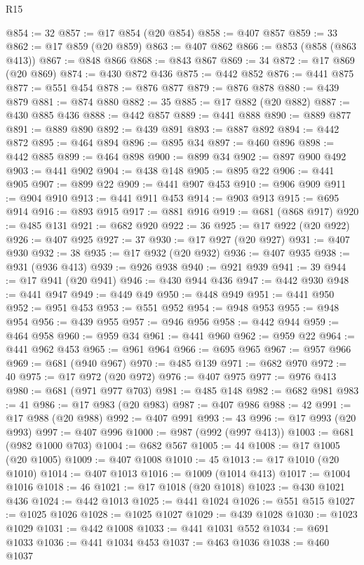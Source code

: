\begin{lexlean}{R15}
\begin{coremodule}
@854 := 32
@857 := @17 @854 (@20 @854)
@858 := @407 @857
@859 := 33
@862 := @17 @859 (@20 @859)
@863 := @407 @862
@866 := @853 (@858 (@863 @413))
@867 := @848 @866
@868 := @843 @867
@869 := 34
@872 := @17 @869 (@20 @869)
@874 := @430 @872 @436
@875 := @442 @852
@876 := @441 @875
@877 := @551 @454
@878 := @876 @877
@879 := @876 @878
@880 := @439 @879
@881 := @874 @880
@882 := 35
@885 := @17 @882 (@20 @882)
@887 := @430 @885 @436
@888 := @442 @857
@889 := @441 @888
@890 := @889 @877
@891 := @889 @890
@892 := @439 @891
@893 := @887 @892
@894 := @442 @872
@895 := @464 @894
@896 := @895 @34
@897 := @460 @896
@898 := @442 @885
@899 := @464 @898
@900 := @899 @34
@902 := @897 @900 @492
@903 := @441 @902
@904 := @438 @148
@905 := @895 @22
@906 := @441 @905
@907 := @899 @22
@909 := @441 @907 @453
@910 := @906 @909
@911 := @904 @910
@913 := @441 @911 @453
@914 := @903 @913
@915 := @695 @914
@916 := @893 @915
@917 := @881 @916
@919 := @681 (@868 @917)
@920 := @485 @131
@921 := @682 @920
@922 := 36
@925 := @17 @922 (@20 @922)
@926 := @407 @925
@927 := 37
@930 := @17 @927 (@20 @927)
@931 := @407 @930
@932 := 38
@935 := @17 @932 (@20 @932)
@936 := @407 @935
@938 := @931 (@936 @413)
@939 := @926 @938
@940 := @921 @939
@941 := 39
@944 := @17 @941 (@20 @941)
@946 := @430 @944 @436
@947 := @442 @930
@948 := @441 @947
@949 := @449 @49
@950 := @448 @949
@951 := @441 @950
@952 := @951 @453
@953 := @551 @952
@954 := @948 @953
@955 := @948 @954
@956 := @439 @955
@957 := @946 @956
@958 := @442 @944
@959 := @464 @958
@960 := @959 @34
@961 := @441 @960
@962 := @959 @22
@964 := @441 @962 @453
@965 := @961 @964
@966 := @695 @965
@967 := @957 @966
@969 := @681 (@940 @967)
@970 := @485 @139
@971 := @682 @970
@972 := 40
@975 := @17 @972 (@20 @972)
@976 := @407 @975
@977 := @976 @413
@980 := @681 (@971 @977 @703)
@981 := @485 @148
@982 := @682 @981
@983 := 41
@986 := @17 @983 (@20 @983)
@987 := @407 @986
@988 := 42
@991 := @17 @988 (@20 @988)
@992 := @407 @991
@993 := 43
@996 := @17 @993 (@20 @993)
@997 := @407 @996
@1000 := @987 (@992 (@997 @413))
@1003 := @681 (@982 @1000 @703)
@1004 := @682 @567
@1005 := 44
@1008 := @17 @1005 (@20 @1005)
@1009 := @407 @1008
@1010 := 45
@1013 := @17 @1010 (@20 @1010)
@1014 := @407 @1013
@1016 := @1009 (@1014 @413)
@1017 := @1004 @1016
@1018 := 46
@1021 := @17 @1018 (@20 @1018)
@1023 := @430 @1021 @436
@1024 := @442 @1013
@1025 := @441 @1024
@1026 := @551 @515
@1027 := @1025 @1026
@1028 := @1025 @1027
@1029 := @439 @1028
@1030 := @1023 @1029
@1031 := @442 @1008
@1033 := @441 @1031 @552
@1034 := @691 @1033
@1036 := @441 @1034 @453
@1037 := @463 @1036
@1038 := @460 @1037

\end{coremodule}
\end{lexlean}
